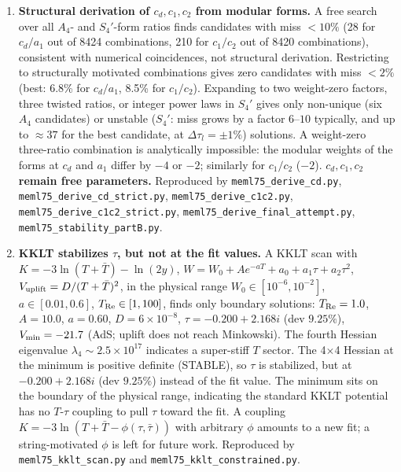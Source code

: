 \documentclass[12pt,a4paper]{article}
\numberwithin{equation}{section}
\begin{document}
\begin{enumerate}[leftmargin=1.5em]
\item \textbf{Structural derivation of \(c_d, c_1, c_2\) from
modular forms.}
A free search over all \(A_4\)- and \(S_4'\)-form ratios finds
candidates with miss \(<10\%\) (28 for \(c_d/a_1\) out of 8424
combinations, 210 for \(c_1/c_2\) out of 8420 combinations),
consistent with numerical coincidences, not structural derivation.
Restricting to structurally motivated combinations gives zero
candidates with miss \(<2\%\) (best: 6.8\% for \(c_d/a_1\), 8.5\%
for \(c_1/c_2\)). Expanding to two weight-zero factors, three
twisted ratios, or integer power laws in \(S_4'\) gives only
non-unique (six \(A_4\) candidates) or unstable (\(S_4'\): miss
grows by a factor \(6\)--\(10\) typically, and up to \(\approx 37\)
for the best candidate, at \(\Delta\tau_l = \pm1\%\)) solutions.
A weight-zero three-ratio combination is analytically impossible:
the modular weights of the forms at \(c_d\) and \(a_1\) differ by
\(-4\) or \(-2\); similarly for \(c_1/c_2\) (\(-2\)).
\textbf{\(c_d, c_1, c_2\) remain free parameters.}
Reproduced by \texttt{meml75\_derive\_cd.py},
\texttt{meml75\_derive\_cd\_strict.py}, \texttt{meml75\_derive\_c1c2.py},
\texttt{meml75\_derive\_c1c2\_strict.py},
\texttt{meml75\_derive\_final\_attempt.py},
\texttt{meml75\_stability\_partB.py}.

\item \textbf{KKLT stabilizes \(\tau\), but not at the fit values.}
A KKLT scan with \(K = -3\ln(T+\bar T) - \ln(2y)\),
\(W = W_0 + Ae^{-aT} + a_0 + a_1\tau + a_2\tau^2\),
\(V_{\rm uplift} = D/(T+\bar T)^2\), in the physical range
\(W_0 \in [10^{-6},10^{-2}]\), \(a \in [0.01,0.6]\),
\(T_{\rm Re} \in [1,100]\), finds only boundary solutions:
\(T_{\rm Re} = 1.0\), \(A = 10.0\), \(a = 0.60\),
\(D = 6\times10^{-8}\), \(\tau = -0.200+2.168i\) (dev \(9.25\%\)),
\(V_{\rm min} = -21.7\) (AdS; uplift does not reach Minkowski).
The fourth Hessian eigenvalue \(\lambda_4 \sim 2.5\times10^{17}\)
indicates a super-stiff \(T\) sector. The 4\(\times\)4 Hessian at the
minimum is positive definite (STABLE), so \(\tau\) is stabilized, but
at \(-0.200+2.168i\) (dev \(9.25\%\)) instead of the fit value. The
minimum sits on the boundary of the physical range, indicating the
standard KKLT potential has no \(T\)-\(\tau\) coupling to pull
\(\tau\) toward the fit. A coupling
\(K = -3\ln(T+\bar T - \phi(\tau,\bar\tau))\) with arbitrary \(\phi\)
amounts to a new fit; a string-motivated \(\phi\) is left for future
work. Reproduced by \texttt{meml75\_kklt\_scan.py} and
\texttt{meml75\_kklt\_constrained.py}.
\end{enumerate}
\end{document}
